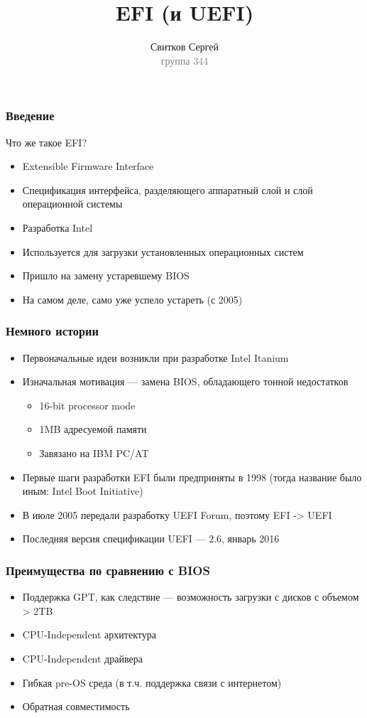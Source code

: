 \documentclass{beamer}
\begin{document}
\title{EFI (и UEFI)}
\author{Свитков Сергей\\{\footnotesize\textcolor{gray}{группа 344}}}
\frame{\titlepage}

\begin{frame}\frametitle{Введение}
Что же такое EFI?
\begin{itemize}
    \item Extensible Firmware Interface 
    \item Спецификация интерфейса, разделяющего аппаратный слой и слой операционной системы
    \item Разработка Intel
    \item Используется для загрузки установленных операционных систем
    \item Пришло на замену устаревшему BIOS
    \item На самом деле, само уже успело устареть (с 2005)
\end{itemize}
\end{frame}

\begin{frame}\frametitle{Немного истории}
\begin{itemize}
    \item Первоначальные идеи возникли при разработке Intel Itanium
    \item Изначальная мотивация --- замена BIOS, обладающего тонной недостатков
    \begin{itemize}
        \item 16-bit processor mode
        \item 1MB адресуемой памяти
        \item Завязано на IBM PC/AT
    \end{itemize}
    \item Первые шаги разработки EFI были предприняты в 1998 (тогда название было иным: Intel Boot Initiative)
    \item В июле 2005 передали разработку UEFI Forum, поэтому EFI -> UEFI
    \item Последняя версия спецификации UEFI --- 2.6, январь 2016
\end{itemize}    
\end{frame}

\begin{frame}\frametitle{Преимущества по сравнению с BIOS}
\begin{itemize}
    \item Поддержка GPT, как следствие --- возможность загрузки с дисков с объемом > 2TB
    \item CPU-Independent архитектура
    \item CPU-Independent драйвера
    \item Гибкая pre-OS среда (в т.ч. поддержка связи с интернетом)
    \item Обратная совместимость
\end{itemize}
\end{frame}
\end{document}
